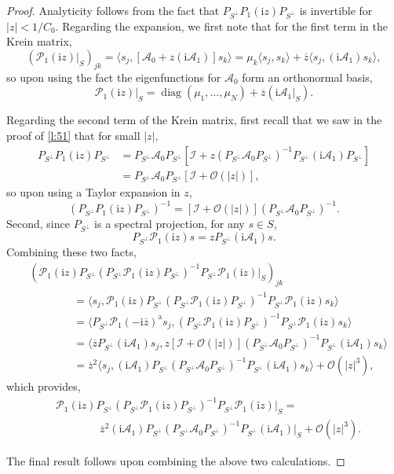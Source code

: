 \documentclass[review,onefignum,onetabnum]{siamart171218}
\def\diag{\mathop\mathrm{diag}\nolimits}
\newcommand{\rma}{\mathrm{a}}
\newcommand{\rmi}{\mathrm{i}}
\newcommand{\calA}{\mathcal{A}}
\newcommand{\calI}{\mathcal{I}}
\newcommand{\calO}{\mathcal{O}}
\newcommand{\calP}{\mathcal{P}}
\begin{document}
\begin{proof}
Analyticity follows from the fact that $P_{S^\perp}P_1(\rmi z)P_{S^\perp}$ is invertible for $|z|<1/C_0$. Regarding the expansion, we first note that for the first term in the Krein matrix,
\[
\left(\calP_1(\rmi z)|_S\right)_{jk}=\langle s_j,[\calA_0+z(\rmi\calA_1)]s_k\rangle=
\mu_k\langle s_j,s_k\rangle+\overline{z}\langle s_j,(\rmi\calA_1)s_k\rangle,
\]
so upon using the fact the eigenfunctions for $\calA_0$ form an orthonormal basis,
\[
\calP_1(\rmi z)|_S=\diag(\mu_1,\dots,\mu_N)+\overline{z}\left(\rmi\calA_1|_S\right).
\]

Regarding the second term of the Krein matrix, first recall that we saw in the proof of \cref{l:51} that for small $|z|$,
\[
\begin{aligned}
P_{S^\perp}P_1(\rmi z)P_{S^\perp}&=P_{S^\perp}\calA_0P_{S^\perp}
\left[\calI+z
\left(P_{S^\perp}\calA_0P_{S^\perp}\right)^{-1}P_{S^\perp}(\rmi\calA_1)P_{S^\perp}\right]\\
&=P_{S^\perp}\calA_0P_{S^\perp}\left[\calI+\calO(|z|)\right],
\end{aligned}
\]
so upon using a Taylor expansion in $z$,
\[
\left(P_{S^\perp}P_1(\rmi z)P_{S^\perp}\right)^{-1}=
\left[\calI+\calO(|z|)\right]\left(P_{S^\perp}\calA_0P_{S^\perp}\right)^{-1}.
\]
Second, since $P_{S^\perp}$ is a spectral projection, for any $s\in S$,
\[
P_{S^\perp}\calP_1(\rmi z)s=zP_{S^\perp}(\rmi\calA_1)s.
\]
Combining these two facts,
\[
\begin{aligned}
&\left(\calP_1(\rmi z)P_{S^\perp}(P_{S^\perp}\calP_1(\rmi z)P_{S^\perp})^{-1}P_{S^\perp}\calP_1(\rmi z)|_{S}\right)_{jk} \\
&\qquad\qquad=
\langle s_j,\calP_1(\rmi z)P_{S^\perp}(P_{S^\perp}\calP_1(\rmi z)P_{S^\perp})^{-1}P_{S^\perp}\calP_1(\rmi z)s_k\rangle \\
     &\qquad\qquad=\langle P_{S^\perp}\calP_1(-\rmi\overline{z})^\rma s_j,(P_{S^\perp}\calP_1(\rmi z)P_{S^\perp})^{-1}P_{S^\perp}\calP_1(\rmi z)s_k\rangle\\
     &\qquad\qquad=\langle\overline{z}P_{S^\perp}(\rmi\calA_1)s_j,
z\left[\calI+\calO(|z|)\right]\left(P_{S^\perp}\calA_0P_{S^\perp}\right)^{-1}
P_{S^\perp}(\rmi\calA_1)s_k\rangle\\
&\qquad\qquad=\overline{z}^2\langle s_j,(\rmi\calA_1)P_{S^\perp}\left(P_{S^\perp}\calA_0P_{S^\perp}\right)^{-1}
P_{S^\perp}(\rmi\calA_1)s_k\rangle+\calO(|z|^3),
\end{aligned}
\]
which provides,
\[
\begin{aligned}
&\calP_1(\rmi z)P_{S^\perp}(P_{S^\perp}\calP_1(\rmi z)P_{S^\perp})^{-1}P_{S^\perp}\calP_1(\rmi z)|_{S}=\\
&\qquad\qquad\overline{z}^2
(\rmi\calA_1)P_{S^\perp}\left(P_{S^\perp}\calA_0P_{S^\perp}\right)^{-1}P_{S^\perp}(\rmi\calA_1)|_S
+\calO(|z|^3).
\end{aligned}
\]

The final result follows upon combining the above two calculations.
\end{proof}
\end{document}
